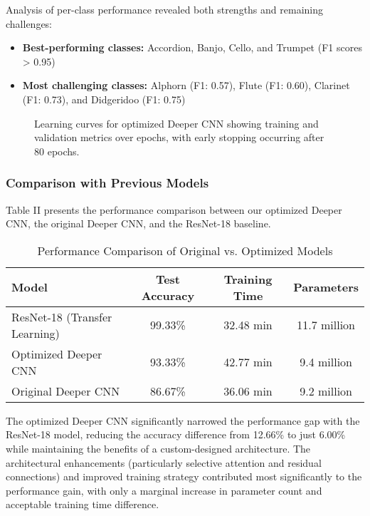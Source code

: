 Analysis of per-class performance revealed both strengths and remaining challenges:

\begin{itemize}
    \item \textbf{Best-performing classes:} Accordion, Banjo, Cello, and Trumpet (F1 scores > 0.95)
    \item \textbf{Most challenging classes:} Alphorn (F1: 0.57), Flute (F1: 0.60), Clarinet (F1: 0.73), and Didgeridoo (F1: 0.75)
\end{itemize}

\begin{figure}[ht]
    \centering
    \caption{Learning curves for optimized Deeper CNN showing training and validation metrics over epochs, with early stopping occurring after 80 epochs.}
    \label{fig:optimized_learning_curve}
\end{figure}

\subsubsection{Comparison with Previous Models}
Table II presents the performance comparison between our optimized Deeper CNN, the original Deeper CNN, and the ResNet-18 baseline.

\begin{table}[ht]
\caption{Performance Comparison of Original vs. Optimized Models}
\centering
\begin{tabular}{lccc}
\toprule
\textbf{Model} & \textbf{Test Accuracy} & \textbf{Training Time} & \textbf{Parameters} \\
\midrule
ResNet-18 (Transfer Learning) & 99.33\% & 32.48 min & 11.7 million \\
Optimized Deeper CNN & 93.33\% & 42.77 min & 9.4 million \\
Original Deeper CNN & 86.67\% & 36.06 min & 9.2 million \\
\bottomrule
\end{tabular}
\end{table}

The optimized Deeper CNN significantly narrowed the performance gap with the ResNet-18 model, reducing the accuracy difference from 12.66\% to just 6.00\% while maintaining the benefits of a custom-designed architecture. The architectural enhancements (particularly selective attention and residual connections) and improved training strategy contributed most significantly to the performance gain, with only a marginal increase in parameter count and acceptable training time difference.

